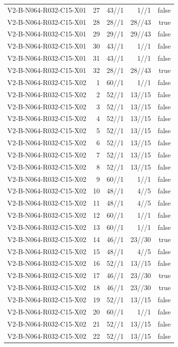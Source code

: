 {\begin{longtable}{lrrrr}
V2-B-N064-R032-C15-X01 & 27 & 43//1 & 1//1 & false \\
V2-B-N064-R032-C15-X01 & 28 & 28//1 & 28//43 & true \\
V2-B-N064-R032-C15-X01 & 29 & 29//1 & 29//43 & false \\
V2-B-N064-R032-C15-X01 & 30 & 43//1 & 1//1 & false \\
V2-B-N064-R032-C15-X01 & 31 & 43//1 & 1//1 & false \\
V2-B-N064-R032-C15-X01 & 32 & 28//1 & 28//43 & true \\
V2-B-N064-R032-C15-X02 & 1 & 60//1 & 1//1 & false \\
V2-B-N064-R032-C15-X02 & 2 & 52//1 & 13//15 & false \\
V2-B-N064-R032-C15-X02 & 3 & 52//1 & 13//15 & false \\
V2-B-N064-R032-C15-X02 & 4 & 52//1 & 13//15 & false \\
V2-B-N064-R032-C15-X02 & 5 & 52//1 & 13//15 & false \\
V2-B-N064-R032-C15-X02 & 6 & 52//1 & 13//15 & false \\
V2-B-N064-R032-C15-X02 & 7 & 52//1 & 13//15 & false \\
V2-B-N064-R032-C15-X02 & 8 & 52//1 & 13//15 & false \\
V2-B-N064-R032-C15-X02 & 9 & 60//1 & 1//1 & false \\
V2-B-N064-R032-C15-X02 & 10 & 48//1 & 4//5 & false \\
V2-B-N064-R032-C15-X02 & 11 & 48//1 & 4//5 & false \\
V2-B-N064-R032-C15-X02 & 12 & 60//1 & 1//1 & false \\
V2-B-N064-R032-C15-X02 & 13 & 60//1 & 1//1 & false \\
V2-B-N064-R032-C15-X02 & 14 & 46//1 & 23//30 & true \\
V2-B-N064-R032-C15-X02 & 15 & 48//1 & 4//5 & false \\
V2-B-N064-R032-C15-X02 & 16 & 52//1 & 13//15 & false \\
V2-B-N064-R032-C15-X02 & 17 & 46//1 & 23//30 & true \\
V2-B-N064-R032-C15-X02 & 18 & 46//1 & 23//30 & true \\
V2-B-N064-R032-C15-X02 & 19 & 52//1 & 13//15 & false \\
V2-B-N064-R032-C15-X02 & 20 & 60//1 & 1//1 & false \\
V2-B-N064-R032-C15-X02 & 21 & 52//1 & 13//15 & false \\
V2-B-N064-R032-C15-X02 & 22 & 52//1 & 13//15 & false \\

\end{longtable}}
